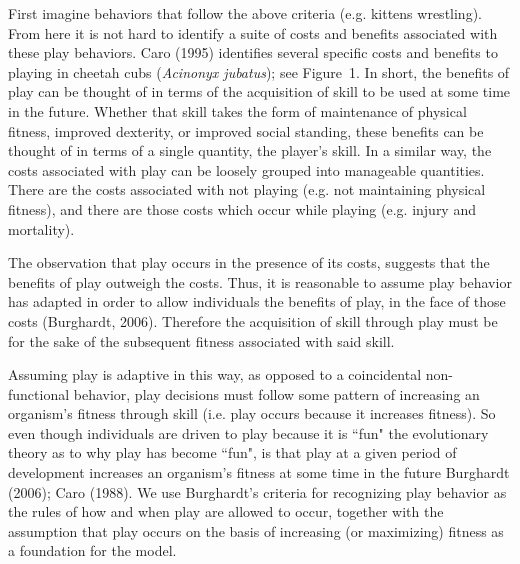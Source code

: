 \documentclass[12pt, letterpaper, fleqn]{article}
\begin{document}
First imagine behaviors that follow the above criteria (e.g. kittens wrestling).  
From here it is not hard to identify a suite of costs and benefits associated with these play behaviors.   
Caro (1995) identifies several specific costs and benefits to playing in cheetah cubs ({\it Acinonyx jubatus}); see \mbox{Figure 1}.  
In short, the benefits of play can be thought of in terms of the acquisition of skill to be used at some time in the future.
Whether that skill takes the form of maintenance of physical fitness, improved dexterity, or improved social standing, these benefits can be thought of in terms of a single quantity, the player's skill. %
In a similar way, the costs associated with play can be loosely grouped into manageable quantities.
There are the costs associated with not playing (e.g. not maintaining physical fitness), and there are those costs which occur while playing (e.g. injury and mortality).

The observation that play occurs in the presence of its costs, suggests that the benefits of play outweigh the costs.
Thus, it is reasonable to assume play behavior has adapted in order to allow individuals the benefits of play, in the face of those costs (Burghardt, 2006).  
Therefore the acquisition of skill through play must be for the sake of the subsequent fitness associated with said skill. 

Assuming play is  adaptive in this way, as opposed to a coincidental non-functional behavior, play decisions must follow some pattern of increasing an organism's fitness through skill (i.e. play occurs because it increases fitness). %
So even though individuals are driven to play because it is ``fun" the evolutionary theory as to why play has become ``fun", is that play at a given period of development increases an organism's fitness at some time in the future Burghardt (2006); Caro (1988). 
We use Burghardt's criteria for recognizing play behavior as the rules of how and when play are allowed to occur, together with the assumption that play occurs on the basis of increasing (or maximizing) fitness as a foundation for the model.
\end{document}
